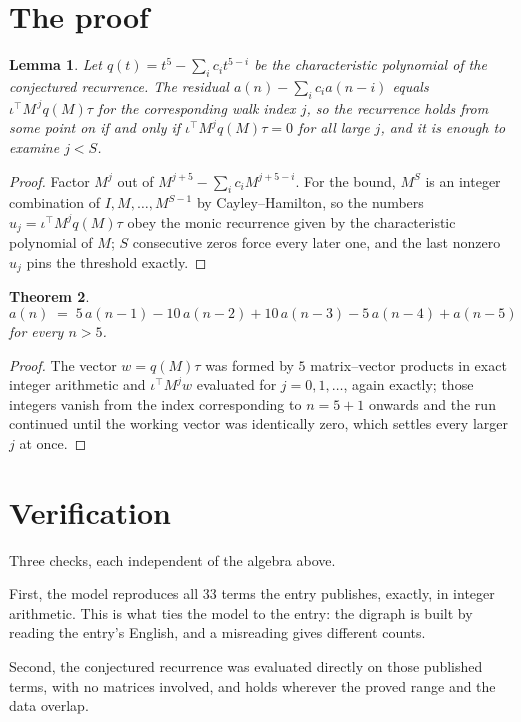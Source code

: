 \documentclass[11pt,a4paper]{article}
\theoremstyle{plain}
\newtheorem{theorem}{Theorem}
\newtheorem{lemma}[theorem]{Lemma}
\theoremstyle{definition}
\begin{document}
\section{The proof}

\begin{lemma}\label{lem:crit}
Let $q(t)=t^{5}-\sum_i c_it^{5-i}$ be the characteristic polynomial of the
conjectured recurrence. The residual $a(n)-\sum_ic_ia(n-i)$ equals
$\iota^{\!\top}M^{\,j}q(M)\tau$ for the corresponding walk index $j$, so the recurrence
holds from some point on if and only if $\iota^{\!\top}M^{j}q(M)\tau=0$ for all large $j$,
and it is enough to examine $j<S$.
\end{lemma}

\begin{proof}
Factor $M^{j}$ out of $M^{j+5}-\sum_ic_iM^{j+5-i}$. For the bound, $M^{S}$
is an integer combination of $I,M,\dots,M^{S-1}$ by Cayley--Hamilton, so the numbers
$u_j=\iota^{\!\top}M^{j}q(M)\tau$ obey the monic recurrence given by the characteristic
polynomial of $M$; $S$ consecutive zeros force every later one, and the last nonzero $u_j$
pins the threshold exactly.
\end{proof}

\begin{theorem}
\[
a(n)\;=\;5\,a(n-1) - 10\,a(n-2) + 10\,a(n-3) - 5\,a(n-4) + a(n-5)
\]
for every $n>5$.
\end{theorem}

\begin{proof}
The vector $w=q(M)\tau$ was formed by $5$ matrix--vector products in exact integer
arithmetic and $\iota^{\!\top}M^{j}w$ evaluated for $j=0,1,\dots$, again exactly; those
integers vanish from the index corresponding to $n=5+1$ onwards and the run continued
until the working vector was identically zero, which settles every larger $j$ at once.
\end{proof}

\section{Verification}

Three checks, each independent of the algebra above.

First, the model reproduces all $33$ terms the entry publishes, exactly, in integer
arithmetic. This is what ties the model to the entry: the digraph is built by reading the
entry's English, and a misreading gives different counts.

Second, the conjectured recurrence was evaluated directly on those published terms, with no
matrices involved, and holds wherever the proved range and the data overlap.
\end{document}
